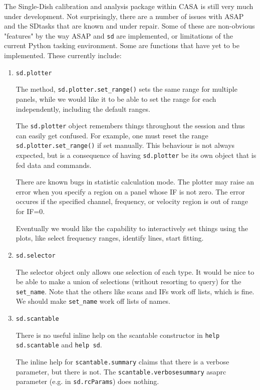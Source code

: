 The Single-Dish calibration and analysis package within CASA is still
very much under development.  Not surprisingly,
there are a number of issues with ASAP and the SDtasks that are known and
under repair.  Some of these are non-obvious "features" by the way
ASAP and {\tt sd} are implemented, or limitations of the current Python
tasking environment.  Some are functions that have yet to be
implemented.  These currently include: 

\begin{enumerate}

\item {\tt sd.plotter}

  The method, {\tt sd.plotter.set\_range()} sets the same range for
  multiple panels, while we would like it to be able to set the
  range for each independently, including the default ranges.

  The {\tt sd.plotter} object remembers things throughout the session and
  thus can easily get confused. For example, one must reset the
  range {\tt sd.plotter.set\_range()} if set manually. This behaviour is
  not always expected, but is a consequence of having {\tt sd.plotter} be
  its own object that is fed data and commands.

  There are known bugs in statistic calculation mode.
  The plotter may raise an error when you specify a region on a panel whose IF is not zero. 
  The error occures if the specified channel, frequency, or velocity region is out of 
  range for IF=0.

  Eventually we would like the capability to interactively
  set things using the plots, like select frequency ranges,
  identify lines, start fitting. 

\item {\tt sd.selector}

  The selector object only allows one selection of each type.  It would be 
  nice to be able to make a union of selections (without resorting to query)
  for the {\tt set\_name}.  Note that the others like scans and IFs work off
  lists, which is fine.  We should make {\tt set\_name} work off lists of names.

\item {\tt sd.scantable}

  There is no useful inline help on the scantable constructor
  in {\tt help sd.scantable} and {\tt help sd}.

  The inline help for {\tt scantable.summary} claims that there is
  a verbose parameter, but there is not.  The {\tt scantable.verbosesummary}
  asaprc parameter (e.g. in {\tt sd.rcParams}) does nothing.


\end{enumerate}
